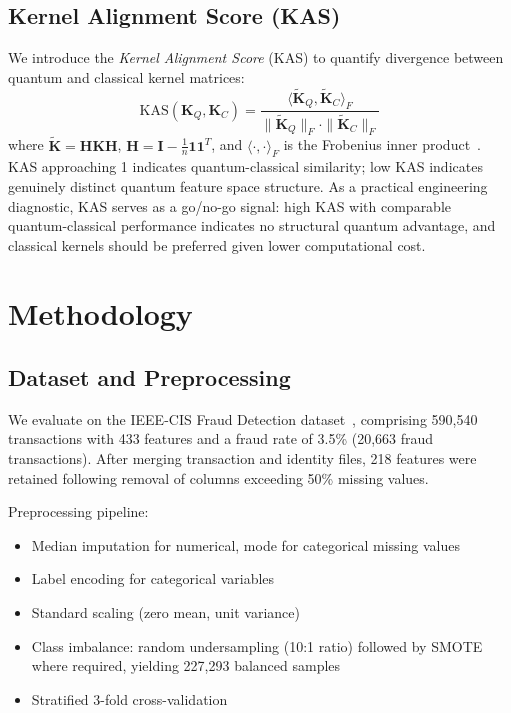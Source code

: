\documentclass[journal]{IEEEtran}
\begin{document}
\subsection{Kernel Alignment Score (KAS)}
We introduce the \textit{Kernel Alignment Score} (KAS) to 
quantify divergence between quantum and classical kernel matrices:
\begin{equation}
    \text{KAS}(\mathbf{K}_Q, \mathbf{K}_C) = 
    \frac{\langle \tilde{\mathbf{K}}_Q, 
    \tilde{\mathbf{K}}_C \rangle_F}
    {\|\tilde{\mathbf{K}}_Q\|_F \cdot 
    \|\tilde{\mathbf{K}}_C\|_F}
\end{equation}
where $\tilde{\mathbf{K}} = \mathbf{H}\mathbf{K}\mathbf{H}$, 
$\mathbf{H} = \mathbf{I} - \frac{1}{n}\mathbf{1}\mathbf{1}^T$, 
and $\langle \cdot, \cdot \rangle_F$ is the Frobenius inner 
product~\cite{cristianini2001}. KAS approaching 1 indicates 
quantum-classical similarity; low KAS indicates genuinely 
distinct quantum feature space structure. As a practical 
engineering diagnostic, KAS serves as a go/no-go signal: 
high KAS with comparable quantum-classical performance 
indicates no structural quantum advantage, and classical 
kernels should be preferred given lower computational cost.

\section{Methodology}
\label{sec:methodology}

\subsection{Dataset and Preprocessing}
We evaluate on the IEEE-CIS Fraud Detection 
dataset~\cite{ieee_cis_dataset}, comprising 590,540 
transactions with 433 features and a fraud rate of 
3.5\% (20,663 fraud transactions). After merging transaction 
and identity files, 218 features were retained following 
removal of columns exceeding 50\% missing values.

Preprocessing pipeline:
\begin{itemize}
    \item Median imputation for numerical, mode for 
    categorical missing values
    \item Label encoding for categorical variables
    \item Standard scaling (zero mean, unit variance)
    \item Class imbalance: random undersampling (10:1 ratio) 
    followed by SMOTE~\cite{chawla2002smote} where required, 
    yielding 227,293 balanced samples
    \item Stratified 3-fold cross-validation
\end{itemize}
\end{document}
